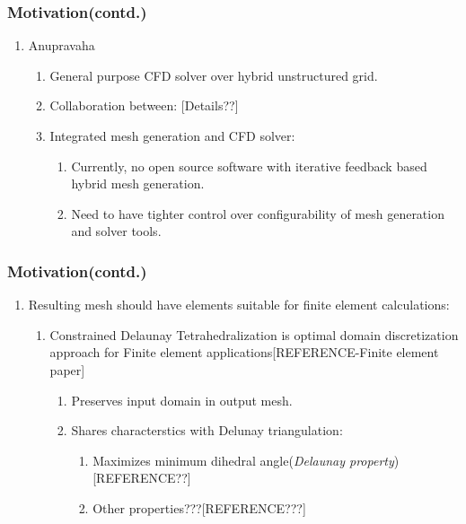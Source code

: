 \documentclass{beamer}
\begin{document}
	\begin{frame}
		\frametitle{Motivation(contd.)}
			\begin{enumerate}
				\item Anupravaha
					\begin{enumerate}
						\item General purpose CFD solver over hybrid unstructured grid.
						\item Collaboration between: [Details??]
						\item Integrated mesh generation and CFD solver:
							\begin{enumerate}
								\item Currently, no open source software  with iterative feedback based hybrid mesh generation.
								\item Need to have tighter control over configurability of mesh generation and solver tools.	
							\end{enumerate}	
					\end{enumerate}		
			\end{enumerate}		
	\end{frame}	
	\begin{frame}	
		\frametitle{Motivation(contd.)}	
			\begin{enumerate}
				\item Resulting mesh should have elements suitable for finite element calculations:
					\begin{enumerate}
						\item Constrained Delaunay Tetrahedralization is optimal domain discretization approach for Finite element applications[REFERENCE-Finite element paper]
							\begin{enumerate}
								\item Preserves input domain in output mesh.
								\item Shares characterstics with Delunay triangulation:	
									\begin{enumerate}
										\item Maximizes minimum dihedral angle(\textit{Delaunay property})[REFERENCE??]
										\item Other properties???[REFERENCE???]
									\end{enumerate}
							\end{enumerate}		
					\end{enumerate}		
			\end{enumerate}		
	\end{frame}
\end{document}
